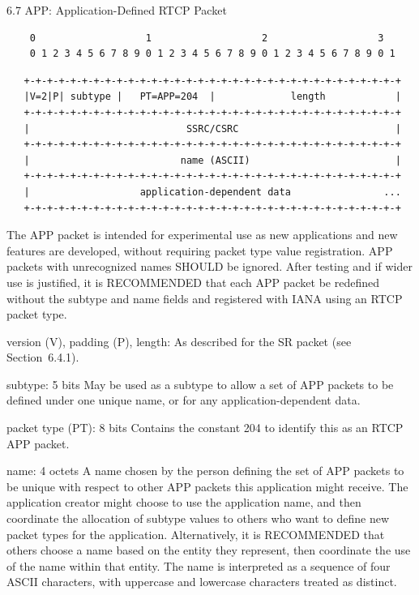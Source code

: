 \documentclass{article}
\begin{document}
6.7 APP: Application-Defined RTCP Packet

\begin{verbatim}
    0                   1                   2                   3
    0 1 2 3 4 5 6 7 8 9 0 1 2 3 4 5 6 7 8 9 0 1 2 3 4 5 6 7 8 9 0 1
\end{verbatim}

\begin{verbatim}
   +-+-+-+-+-+-+-+-+-+-+-+-+-+-+-+-+-+-+-+-+-+-+-+-+-+-+-+-+-+-+-+-+
   |V=2|P| subtype |   PT=APP=204  |             length            |
   +-+-+-+-+-+-+-+-+-+-+-+-+-+-+-+-+-+-+-+-+-+-+-+-+-+-+-+-+-+-+-+-+
   |                           SSRC/CSRC                           |
   +-+-+-+-+-+-+-+-+-+-+-+-+-+-+-+-+-+-+-+-+-+-+-+-+-+-+-+-+-+-+-+-+
   |                          name (ASCII)                         |
   +-+-+-+-+-+-+-+-+-+-+-+-+-+-+-+-+-+-+-+-+-+-+-+-+-+-+-+-+-+-+-+-+
   |                   application-dependent data                ...
   +-+-+-+-+-+-+-+-+-+-+-+-+-+-+-+-+-+-+-+-+-+-+-+-+-+-+-+-+-+-+-+-+
\end{verbatim}

The APP packet is intended for experimental use as new applications and new features are developed, without requiring packet type value registration.  APP packets with unrecognized names SHOULD be ignored. After testing and if wider use is justified, it is RECOMMENDED that each APP packet be redefined without the subtype and name fields and registered with IANA using an RTCP packet type.

version (V), padding (P), length: As described for the SR packet (see Section~6.4.1).

subtype: 5 bits May be used as a subtype to allow a set of APP packets to be defined under one unique name, or for any application-dependent data.

packet type (PT): 8 bits Contains the constant 204 to identify this as an RTCP APP packet.

name: 4 octets A name chosen by the person defining the set of APP packets to be unique with respect to other APP packets this application might receive.  The application creator might choose to use the application name, and then coordinate the allocation of subtype values to others who want to define new packet types for the application.  Alternatively, it is RECOMMENDED that others choose a name based on the entity they represent, then coordinate the use of the name within that entity.  The name is interpreted as a sequence of four ASCII characters, with uppercase and lowercase characters treated as distinct.
\end{document}
